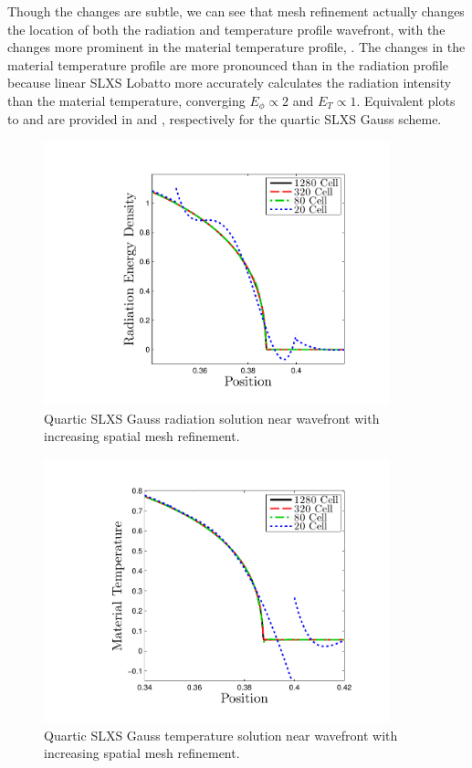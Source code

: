 Though the changes are subtle, we can see that mesh refinement actually changes the location of both the radiation and temperature profile wavefront, with the changes more prominent in the material temperature profile, .
The changes in the material temperature profile are more pronounced than in the radiation profile because linear SLXS Lobatto more accurately calculates the radiation intensity than the material temperature, converging $E_{\phi} \propto 2$ and $E_T \propto 1$.
Equivalent plots to  and  are provided in  and , respectively for the quartic SLXS Gauss scheme.
\begin{figure}[!hbp]
\centering
\includegraphics[width=10cm,trim=1.0in  0.2in 0.5in 0.5in,clip=true]{chapter6_grey_radtran/Dissertation_Data/Reorder_Marshak_Zoom_Radiation_SL_Gauss_P4_Cell_Refinement.pdf}
\caption{Quartic SLXS Gauss radiation solution near wavefront with increasing spatial mesh refinement.}
\label{fig:gauss_convergence_rad}
\end{figure}
%
%
\begin{figure}[!htp]
\centering
\includegraphics[width=10cm,trim=1.0in  0.2in 0.5in 0.5in,clip=true]{chapter6_grey_radtran/Dissertation_Data/Reorder_Marshak_Zoom_Temperature_SL_Gauss_P4_Cell_Refinement.pdf}
\caption{Quartic SLXS Gauss temperature solution near wavefront with increasing spatial mesh refinement.}
\label{fig:gauss_convergence_temp}
\end{figure}
